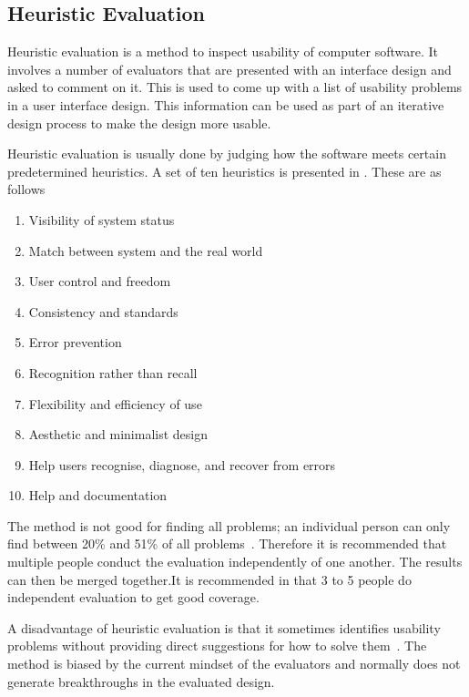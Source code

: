 \subsection{Heuristic Evaluation}
Heuristic evaluation is a method to inspect usability of computer
software. It involves a number of evaluators that are presented with
an interface design and asked to comment on it. This is used to come
up with a list of usability problems in a user interface design. This
information can be used as part of an iterative design process to make the design more usable.

Heuristic evaluation is usually done by judging how the software meets
certain predetermined heuristics. A set of ten heuristics
is presented in . These are as follows

\begin{enumerate}
  \item Visibility of system status
  \item Match between system and the real world
  \item User control and freedom
  \item Consistency and standards
  \item Error prevention
  \item Recognition rather than recall
  \item Flexibility and efficiency of use
  \item Aesthetic and minimalist design
  \item Help users recognise, diagnose, and recover from errors
  \item Help and documentation
\end{enumerate}

The method is not good for finding all problems; an individual person
can only find between 20\% and 51\% of all
problems~\cite{Nielsen1990}. Therefore it is recommended that multiple
people conduct the evaluation independently of one another. The
results can then be merged together.It is recommended in  that 3 to 5 people do independent evaluation to get good coverage.

A disadvantage of heuristic evaluation is that it sometimes identifies usability problems without providing direct suggestions for how to solve them~\cite{Nielsen1990}. The method is biased by the current mindset of the evaluators and normally does not generate breakthroughs in the evaluated design.

